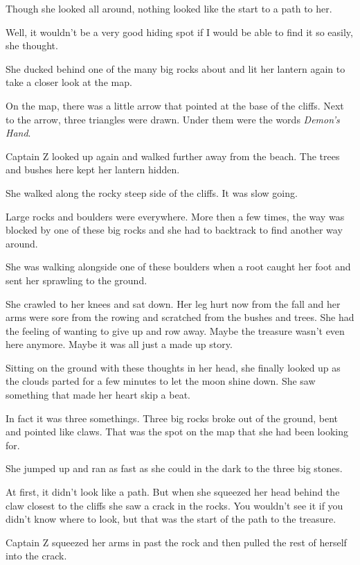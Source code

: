 \documentclass[12pt]{extbook}
\begin{document}
  Though she looked all around, nothing looked like the start to a path to
  her.
  
  Well, it wouldn't be a very good hiding spot if I would be able to find
  it so easily, she thought.
  
  She ducked behind one of the many big rocks about and lit her lantern
  again to take a closer look at the map.
  
  On the map, there was a little arrow that pointed at the base of the
  cliffs. Next to the arrow, three triangles were drawn. Under them were
  the words \emph{Demon's Hand}.
  
  Captain Z looked up again and walked further away from the beach. The
  trees and bushes here kept her lantern hidden.
  
  She walked along the rocky steep side of the cliffs. It was slow going.
  
  Large rocks and boulders were everywhere. More then a few times, the way
  was blocked by one of these big rocks and she had to backtrack to find
  another way around.
  
  She was walking alongside one of these boulders when a root caught her
  foot and sent her sprawling to the ground.
  
  She crawled to her knees and sat down. Her leg hurt now from the fall
  and her arms were sore from the rowing and scratched from the bushes and
  trees. She had the feeling of wanting to give up and row away. Maybe the
  treasure wasn't even here anymore. Maybe it was all just a made up
  story.
  
  Sitting on the ground with these thoughts in her head, she finally
  looked up as the clouds parted for a few minutes to let the moon shine
  down. She saw something that made her heart skip a beat.
  
  In fact it was three somethings. Three big rocks broke out of the
  ground, bent and pointed like claws. That was the spot on the map that
  she had been looking for.
  
  She jumped up and ran as fast as she could in the dark to the three big
  stones.
  
  At first, it didn't look like a path. But when she squeezed her head
  behind the claw closest to the cliffs she saw a crack in the rocks. You
  wouldn't see it if you didn't know where to look, but that was the start
  of the path to the treasure.
  
  Captain Z squeezed her arms in past the rock and then pulled the rest of
  herself into the crack.
  
\end{document}
